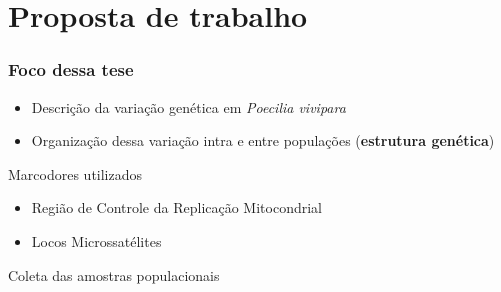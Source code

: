 \documentclass{beamer}
\begin{document}
\section{Proposta de trabalho}
\begin{frame}
  \frametitle{ Foco dessa tese}

  \begin{itemize}[<+->]
\item Descri\c{c}ão da variação genética em \textit{Poecilia vivipara}
\item  Organização dessa variação intra e entre populações (\textbf{estrutura genética})
\end{itemize}
\pause
\begin{block}{Marcodores utilizados}
    \begin{itemize}
\item Região de Controle da Replica\c{c}ão Mitocondrial
\item Locos Microssatélites
\end{itemize}
 
\end{block}
\end{frame}

\begin{frame}{Coleta das amostras populacionais}
\centering

\end{frame}

\end{document}
